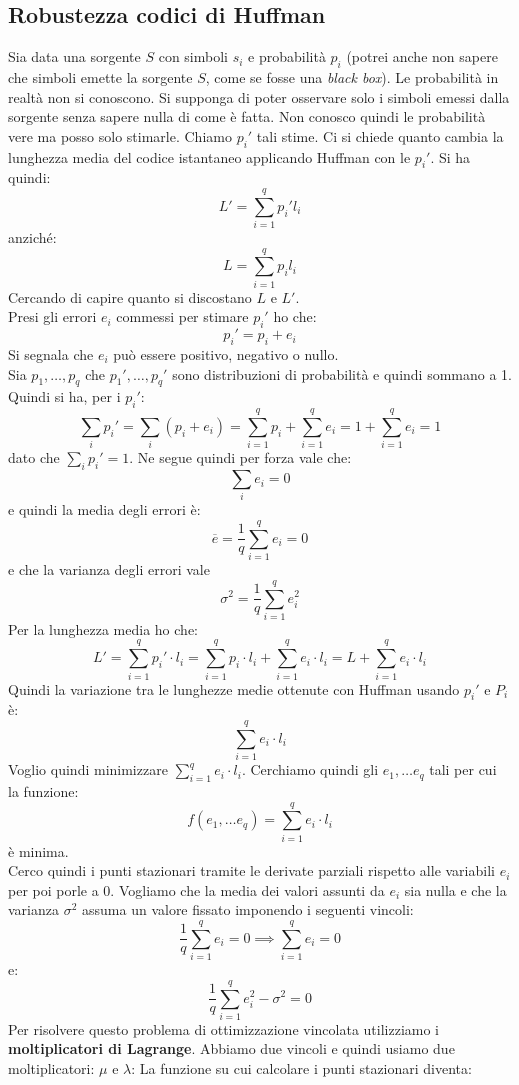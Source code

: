\documentclass[a4paper,12pt, oneside]{book}
\begin{document}
\subsection{Robustezza codici di Huffman}
Sia data una sorgente $S$ con simboli $s_i$ e probabilità $p_i$ (potrei anche
non sapere che simboli emette la sorgente $S$, come se fosse una \textit{black
  box}). Le probabilità in realtà non si conoscono. Si supponga di 
poter osservare solo i simboli emessi dalla sorgente senza sapere nulla di come
è fatta. Non conosco quindi le probabilità vere ma posso solo stimarle. Chiamo
$p_i'$ tali stime. Ci si chiede quanto cambia la lunghezza media del codice
istantaneo applicando Huffman con le $p_i'$. Si ha quindi:
\[L'=\sum_{i=1}^q p_i'l_i\]
anziché:
\[L=\sum_{i=1}^q p_il_i\]
Cercando di capire quanto si discostano $L$ e $L'$.\\
Presi gli errori $e_i$ commessi per stimare $p_i'$ ho che:
\[p_i'=p_i+e_i\]
Si segnala che $e_i$ può essere positivo, negativo o nullo.\\
Sia $p_1,\ldots, p_q$ che $p_1',\ldots, p_q'$ sono distribuzioni di probabilità
e quindi sommano a 1.
Quindi si ha, per i $p_i'$:
\[\sum_ip_i'=\sum_i (p_i+e_i)=\sum_{i=1}^q p_i+\sum_{i=1}^q e_i=1+\sum_{i=1}^q
  e_i=1\] 
dato che $\sum_ip_i'=1$. Ne segue quindi per forza vale che:
\[\sum_i e_i=0\]
e quindi la media degli errori è:
\[\overline{e}=\frac{1}{q}\sum_{i=1}^q e_i=0\]
e che la varianza degli errori vale
\[\sigma^2=\frac{1}{q}\sum_{i=1}^q e_i^2\]
Per la lunghezza media ho che:
\[L'=\sum_{i=1}^q p_i'\cdot l_i=\sum_{i=1}^q p_i\cdot l_i+\sum_{i=1}^q e_i\cdot
  l_i=L+\sum_{i=1}^q e_i\cdot l_i\]
Quindi la variazione tra le lunghezze medie ottenute con Huffman usando $p_i'$ e
$P_i$ è:
\[\sum_{i=1}^q e_i\cdot l_i\]
Voglio quindi minimizzare $\sum_{i=1}^q e_i\cdot l_i$. Cerchiamo quindi gli
$e_1,\ldots e_q$ tali per cui la funzione:
\[f(e_1,\ldots e_q)=\sum_{i=1}^q e_i\cdot l_i\]
è minima.\\
Cerco quindi i punti stazionari tramite le derivate parziali rispetto alle
variabili $e_i$ per poi porle a 0. Vogliamo che la media dei valori assunti da
$e_i$ sia nulla e che la varianza $\sigma^2$ assuma un valore fissato imponendo
i seguenti vincoli:
\[\frac{1}{q}\sum_{i=1}^q e_i=0\implies \sum_{i=1}^q e_i=0\]
e:
\[\frac{1}{q}\sum_{i=1}^q e_i^2-\sigma^2 =0\]
Per risolvere questo problema di ottimizzazione vincolata utilizziamo i
\textbf{moltiplicatori di Lagrange}. Abbiamo due vincoli e quindi usiamo due
moltiplicatori: $\mu$ e $\lambda$:
La funzione su cui calcolare i punti stazionari diventa:
\end{document}
